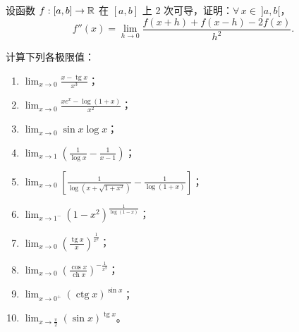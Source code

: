 \begin{exercise}
	\item 设函数 \(f:[a,b]\to\mathbb{R}\) 在 \([a,b]\) 上 2 次可导，证明：\(\forall\,x\in\ ]a,b[\)，
	\[
	f''(x)=\lim_{h\to0}\frac{f(x+h)+f(x-h)-2f(x)}{h^2}.
	\]
\end{exercise}

\begin{exercise}
	\item 计算下列各极限值：
	\begin{enumerate}[label=\arabic*)]
		\item \(\displaystyle\lim_{x\to0}\frac{x-\operatorname{tg}x}{x^3}\)；
		\item \(\displaystyle\lim_{x\to0}\frac{xe^x-\log(1+x)}{x^2}\)；
		\item \(\displaystyle\lim_{x\to0}\sin x\log x\)；
		\item \(\displaystyle\lim_{x\to1}\left(\frac1{\log x}-\frac1{x-1}\right)\)；
		\item \(\displaystyle\lim_{x\to0}\left[\frac1{\log(x+\sqrt{1+x^2})}-\frac1{\log(1+x)}\right]\)；
		\item \(\displaystyle\lim_{x\to1^-}(1-x^2)^{\frac1{\log(1-x)}}\)；
		\item \(\displaystyle\lim_{x\to0}\left(\frac{\operatorname{tg}x}{x}\right)^{\frac1{x^2}}\)；
		\item \(\displaystyle\lim_{x\to0}\left(\frac{\cos x}{\operatorname{ch}x}\right)^{-\frac1{x^2}}\)；
		\item \(\displaystyle\lim_{x\to0^+}(\operatorname{ctg}x)^{\sin x}\)；
		\item \(\displaystyle\lim_{x\to\frac\pi2}(\sin x)^{\operatorname{tg}x}\)。
	\end{enumerate}
\end{exercise}

